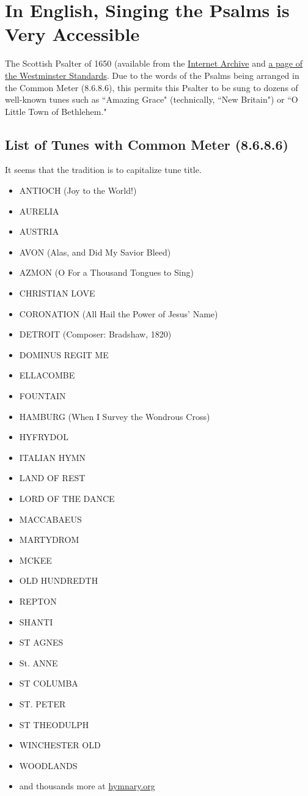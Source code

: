 \documentclass{article}
\begin{document}
\section{In English, Singing the Psalms is Very Accessible}

The Scottish Psalter of 1650 (available from the \href{https://archive.org/details/scotishpsalter/1650%20PSALTER/}{Internet Archive} and \href{https://thewestminsterstandard.org/1650-scottish-metrical-psalter/}{a page of the Westminster Standards}.  Due to the words of the Psalms being arranged in the Common Meter (8.6.8.6), this permits this Psalter to be sung to dozens of well-known tunes such as ``Amazing Grace" (technically, ``New Britain") or ``O Little Town of Bethlehem."
\subsection{List of Tunes with Common Meter (8.6.8.6)}

It seems that the tradition is to capitalize tune title.

\begin{itemize}
	\item ANTIOCH (Joy to the World!)
	\item AURELIA
	\item AUSTRIA
	\item AVON (Alas, and Did My Savior Bleed)
	\item AZMON (O For a Thousand Tongues to Sing)
	\item CHRISTIAN LOVE
	\item CORONATION (All Hail the Power of Jesus' Name)
	\item DETROIT (Composer: Bradshaw, 1820)
	\item DOMINUS REGIT ME
	\item ELLACOMBE
	\item FOUNTAIN
	\item HAMBURG (When I Survey the Wondrous Cross)
	\item HYFRYDOL
	\item ITALIAN HYMN
	\item LAND OF REST
	\item LORD OF THE DANCE
	\item MACCABAEUS
	\item MARTYDROM
	\item MCKEE
	\item OLD HUNDREDTH
	\item REPTON
	\item SHANTI
	\item ST AGNES
	\item St. ANNE
	\item ST COLUMBA
	\item ST. PETER
	\item ST THEODULPH
	\item WINCHESTER OLD
	\item WOODLANDS
	\item and thousands more at \href{https://hymnary.org/search?page=3&qu=meter%3A8.6.8.6%20in%3Atunes&sort=totalInstances}{hymnary.org}
\end{itemize}
\end{document}
